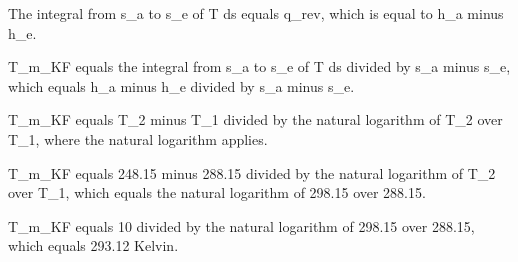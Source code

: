 The integral from s_a to s_e of T ds equals q_rev, which is equal to h_a minus h_e.

T_m_KF equals the integral from s_a to s_e of T ds divided by s_a minus s_e, which equals h_a minus h_e divided by s_a minus s_e.

T_m_KF equals T_2 minus T_1 divided by the natural logarithm of T_2 over T_1, where the natural logarithm applies.

T_m_KF equals 248.15 minus 288.15 divided by the natural logarithm of T_2 over T_1, which equals the natural logarithm of 298.15 over 288.15.

T_m_KF equals 10 divided by the natural logarithm of 298.15 over 288.15, which equals 293.12 Kelvin.